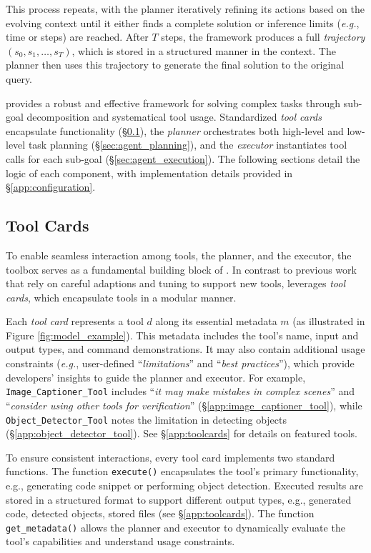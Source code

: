 This process repeats, with the planner iteratively refining its actions based on the evolving context until it either finds a complete solution or inference limits (\textit{e.g.}, time or steps) are reached. After $T$ steps, the framework produces a full \textit{trajectory} $(s_0, s_1, \dots, s_T)$, which is stored in a structured manner in the context. The planner then uses this trajectory to generate the final solution to the original query.


\model provides a robust and effective framework for solving complex tasks through sub-goal decomposition and systematical tool usage. Standardized \textit{tool cards} encapsulate functionality (\S\ref{sec:toolcards}), the \emph{planner} orchestrates both high-level and low-level task planning (\S\ref{sec:agent_planning}), and the \emph{executor} instantiates tool calls for each sub-goal (\S\ref{sec:agent_execution}). The following sections detail the logic of each component, with implementation details provided in \S\ref{app:configuration}.

\subsection{Tool Cards} 
\label{sec:toolcards}

To enable seamless interaction among tools, the planner, and the executor, the toolbox serves as a fundamental building block of \model. In contrast to previous work~\cite{lu2023chameleon,hu2024visual} that rely on careful adaptions and tuning to support new tools, \model leverages \textit{tool cards}, which encapsulate  tools in a modular manner.

Each \textit{tool card} represents a tool $d$ along its essential metadata $m$ (as illustrated in Figure \ref{fig:model_example}). This metadata includes the tool’s name, input and output types, and command demonstrations. It may also contain additional usage constraints (\textit{e.g.}, user-defined ``\textit{limitations}'' and ``\textit{best practices}''), which provide developers’ insights to guide the planner and executor. For example, \texttt{Image\_Captioner\_Tool} includes ``\textit{it may make mistakes in complex scenes}'' and ``\textit{consider using other tools for verification}'' (\S\ref{app:image_captioner_tool}), while \texttt{Object\_Detector\_Tool} notes the limitation in detecting objects  (\S\ref{app:object_detector_tool}). See \S\ref{app:toolcards} for details on featured tools.


To ensure consistent interactions, every tool card implements two standard functions. The function \texttt{execute()} encapsulates the tool’s primary functionality, e.g., generating code snippet or performing object detection. Executed results are stored in a structured format to support different output types, e.g., generated code, detected objects, stored files (see \S\ref{app:toolcards}). The function \texttt{get\_metadata()} allows the planner and executor to dynamically evaluate the tool’s capabilities and understand usage constraints.

